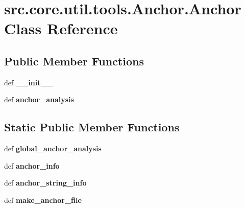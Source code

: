 \hypertarget{classsrc_1_1core_1_1util_1_1tools_1_1Anchor_1_1Anchor}{\section{src.\-core.\-util.\-tools.\-Anchor.\-Anchor Class Reference}
\label{classsrc_1_1core_1_1util_1_1tools_1_1Anchor_1_1Anchor}
}
\subsection*{Public Member Functions}
\begin{DoxyCompactItemize}
\item 
\hypertarget{classsrc_1_1core_1_1util_1_1tools_1_1Anchor_1_1Anchor_aaedd469b791694a3db1c724e820fb9e7}{def {\bfseries \-\_\-\-\_\-init\-\_\-\-\_\-}}\label{classsrc_1_1core_1_1util_1_1tools_1_1Anchor_1_1Anchor_aaedd469b791694a3db1c724e820fb9e7}

\item 
\hypertarget{classsrc_1_1core_1_1util_1_1tools_1_1Anchor_1_1Anchor_ac89d98ad6a01cbe54150f923b316397c}{def {\bfseries anchor\-\_\-analysis}}\label{classsrc_1_1core_1_1util_1_1tools_1_1Anchor_1_1Anchor_ac89d98ad6a01cbe54150f923b316397c}

\end{DoxyCompactItemize}
\subsection*{Static Public Member Functions}
\begin{DoxyCompactItemize}
\item 
\hypertarget{classsrc_1_1core_1_1util_1_1tools_1_1Anchor_1_1Anchor_a82b499111d7c1415b945f12a17071768}{def {\bfseries global\-\_\-anchor\-\_\-analysis}}\label{classsrc_1_1core_1_1util_1_1tools_1_1Anchor_1_1Anchor_a82b499111d7c1415b945f12a17071768}

\item 
\hypertarget{classsrc_1_1core_1_1util_1_1tools_1_1Anchor_1_1Anchor_a8b461ce56a3257954b56a27d7ad2db88}{def {\bfseries anchor\-\_\-info}}\label{classsrc_1_1core_1_1util_1_1tools_1_1Anchor_1_1Anchor_a8b461ce56a3257954b56a27d7ad2db88}

\item 
\hypertarget{classsrc_1_1core_1_1util_1_1tools_1_1Anchor_1_1Anchor_a29328b7148c28ef5d680c91e199175a0}{def {\bfseries anchor\-\_\-string\-\_\-info}}\label{classsrc_1_1core_1_1util_1_1tools_1_1Anchor_1_1Anchor_a29328b7148c28ef5d680c91e199175a0}

\item 
\hypertarget{classsrc_1_1core_1_1util_1_1tools_1_1Anchor_1_1Anchor_a3ba64c6b31eb077129bfba21c08d22ce}{def {\bfseries make\-\_\-anchor\-\_\-file}}\label{classsrc_1_1core_1_1util_1_1tools_1_1Anchor_1_1Anchor_a3ba64c6b31eb077129bfba21c08d22ce}

\end{DoxyCompactItemize}
